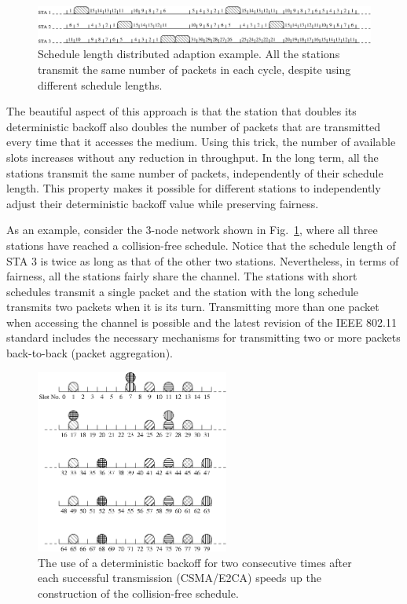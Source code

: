 \documentclass[journal]{IEEEtran}
\begin{document}
\begin{figure}[!t]
\centering
\includegraphics[width=6.0in]{figures/csma_eca_different_backoff}
\caption{Schedule length distributed adaption example. All the stations transmit the same number of packets in each cycle, despite using different schedule lengths.}
\label{fig:csma_eca_different_backoff}
\end{figure}

The beautiful aspect of this approach is that the station that doubles its deterministic backoff also doubles the number of packets that are transmitted every time that it accesses the medium.
Using this trick, the number of available slots increases without any reduction in throughput.
In the long term, all the stations transmit the same number of packets, independently of their schedule length.
This property makes it possible for different stations to independently adjust their deterministic backoff value while preserving fairness.

As an example, consider the 3-node network shown in Fig.~\ref{fig:csma_eca_different_backoff}, where all three stations have reached a collision-free schedule.
Notice that the schedule length of STA 3 is twice as long as that of the other two stations.
Nevertheless, in terms of fairness, all the stations fairly share the channel.
The stations with short schedules transmit a single packet and the station with the long schedule transmits two packets when it is its turn.
Transmitting more than one packet when accessing the channel is possible and the latest revision of the IEEE 802.11 standard includes the necessary mechanisms for transmitting two or more packets back-to-back (packet aggregation).

\begin{figure}[!t]
\centering
\includegraphics[width=2.5in]{figures/csma_e2ca}
\caption{The use of a deterministic backoff for two consecutive times after each successful transmission (CSMA/E2CA) speeds up the construction of the collision-free schedule.}
\label{fig:csma_e2ca}
\end{figure}
\end{document}
